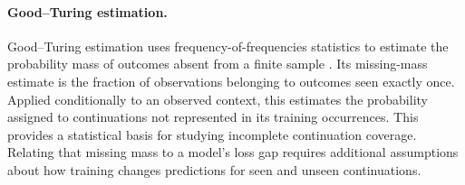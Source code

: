 \paragraph{Good--Turing estimation.}
Good--Turing estimation uses frequency-of-frequencies statistics to estimate the probability mass of outcomes absent from a finite sample \citep{good1953population,gale1995good}. Its missing-mass estimate is the fraction of observations belonging to outcomes seen exactly once. Applied conditionally to an observed context, this estimates the probability assigned to continuations not represented in its training occurrences. This provides a statistical basis for studying incomplete continuation coverage. Relating that missing mass to a model's loss gap requires additional assumptions about how training changes predictions for seen and unseen continuations.